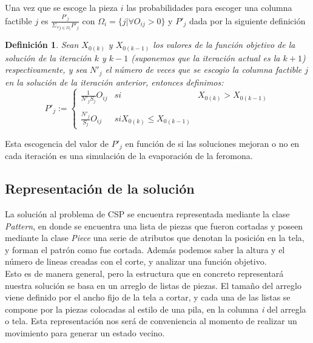 \documentclass[letterpaper,11pt]{article}
\newtheorem*{definicion}{Definici\'on}
\begin{document}
Una vez que se escoge la pieza $i$ las probabilidades para escoger una columna factible $j$ es $\frac{P'_j}{\Sigma _{\forall j\in \Omega _i}P'_j}$ 
con $\Omega _i =\{j|\forall O_{ij}>0\}$ y $P'_j$ dada por la siguiente definici\'on

\begin{definicion}
Sean $X_{0(k)}$ y $X_{0(k-1)}$ los valores de la funci\'on objetivo de la soluci\'on de la iteraci\'on $k$ y $k-1$ (suponemos que la iteraci\'on 
actual es la $k+1$) respectivamente, y sea $N'_j$ el n\'umero de veces que se escogio la columna factible $j$ en la soluci\'on de la 
iteraci\'on anterior, entonces 
definimos:
$$P'_j:=\left\{\begin{array}{lcc}
              \frac{1}{N'_jS_j}O_{ij} & si &  X_{0(k)}> X_{0(k-1)}\\
             \\ \frac{N'_j}{S_j}O_{ij}   & si X_{0(k)}\leq X_{0(k-1)}& 
             \end{array}
      \right.  $$
\end{definicion}

Esta escogencia del valor de $P'_j$ en funci\'on de si las soluciones mejoran o no en cada iteraci\'on es una simulaci\'on de la evaporaci\'on 
de la feromona.

\newpage

\subsection{Representaci\'on de la soluci\'on}

La soluci\'on al problema de CSP se encuentra representada mediante la clase \emph{Pattern}, en donde se encuentra 
una lista de piezas que fueron cortadas y poseen mediante la clase \emph{Piece} una serie de atributos que denotan
la posici\'on en la tela, y forman el patr\'on como fue cortada. Adem\'as podemos saber la altura y el n\'umero de lineas 
creadas con el corte, y analizar una funci\'on objetivo.\\

Esto es de manera general, pero la estructura que en concreto representar\'a nuestra soluci\'on se basa en un arreglo de
listas de piezas. El tamaño del arreglo viene definido por el ancho fijo de la tela a cortar, y cada una de las listas
se compone por la piezas colocadas al estilo de una pila, en la columna \emph{i} del arregla o tela. Esta representaci\'on
nos ser\'a de conveniencia al momento de realizar un movimiento para generar un estado vecino.
\end{document}
